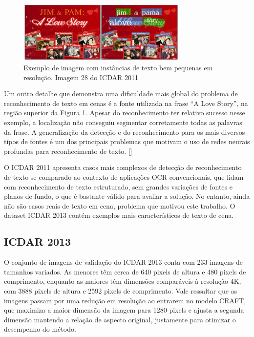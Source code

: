 \begin{figure}
    \centering
    \includegraphics[width=0.75\textwidth]{figs/resultados-icdar11-03.png}
    \caption{Exemplo de imagem com instâncias de texto bem pequenas em resolução. Imagem 28 do ICDAR 2011}
    \label{fig:results_icdar11_03}
\end{figure}

Um outro detalhe que demonstra uma dificuldade mais global do problema de reconhecimento de texto em cenas é a fonte utilizada na frase “A Love Story”, na região superior da Figura \ref{fig:results_icdar11_03}. Apesar do reconhecimento ter relativo sucesso nesse exemplo, a localização não conseguiu segmentar corretamente todas as palavras da frase. A generalização da detecção e do reconhecimento para os mais diversos tipos de fontes é um dos principais problemas que motivam o uso de redes neurais profundas para reconhecimento de texto. []

O ICDAR 2011 apresenta casos mais complexos de detecção de reconhecimento de texto se comparado ao contexto de aplicações OCR convencionais, que lidam com reconhecimento de texto estruturado, sem grandes variações de fontes e planos de fundo, o que é bastante válido para avaliar a solução. No entanto, ainda não são casos reais de texto em cena, problema que motivou este trabalho. O dataset ICDAR 2013 contém exemplos mais característicos de texto de cena.


\subsection{ICDAR 2013}\label{sec:results_icdar_2013}

O conjunto de imagens de validação do ICDAR 2013 conta com 233 imagens de tamanhos variados. As menores têm cerca de 640 pixels de altura e 480 pixels de comprimento, enquanto as maiores têm dimensões comparáveis à resolução 4K, com 3888 pixels de altura e 2592 pixels de comprimento. Vale ressaltar que as imagens passam por uma redução em resolução ao entrarem no modelo CRAFT, que maximiza a maior dimensão da imagem para 1280 pixels e ajusta a segunda dimensão mantendo a relação de aspecto original, justamente para otimizar o desempenho do método.

